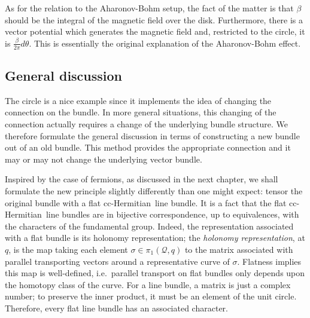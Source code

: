 \documentclass[11pt]{article}
\theoremstyle{remark}
\begin{document}
As for the relation to the Aharonov-Bohm setup, the fact of the matter
is that $\beta$ 
should be the integral of the magnetic field over the
disk. Furthermore, there is a vector potential which generates the
magnetic field and, restricted to the circle, it is 
$\frac{\beta}{2\pi}d\theta$. 
This is essentially 
the original explanation of
the Aharonov-Bohm effect.

\subsection{General discussion}
The circle is a nice example since it implements the idea of changing
the connection on the bundle. In more general situations, this
changing of the connection actually requires a change of the
underlying bundle structure. We therefore formulate the general
discussion in terms of constructing a new bundle out of an old
bundle. This method provides the appropriate connection and it may or
may not change the underlying vector bundle. 


Inspired by the case of fermions, as discussed in the next chapter, 
we shall formulate the new principle slightly differently than one
might expect: tensor
the original bundle with a flat cc-Hermitian\ line bundle.
It is a fact that the flat cc-Hermitian\ line
bundles are in bijective correspondence, up to equivalences,
 with the characters of the
fundamental group. Indeed, 
the  representation associated with
a flat bundle is its holonomy representation; the \emph{holonomy
representation}, at \ensuremath{q}, is the map taking 
each element $\ensuremath{\sigma} \in \ensuremath{\pi_1 ({\ensuremath{\mathcal{Q}}, \ensuremath{q}})}$ to  the matrix
associated with  
parallel transporting vectors around a representative curve of \ensuremath{\sigma}. Flatness
implies this map is well-defined, i.e.\ parallel transport on flat
bundles only depends
upon the homotopy class of the curve.  For a line bundle, a matrix
is just a complex number; to preserve the inner product, it must be an
element of the unit circle. Therefore, every flat line bundle has an
associated character. 
\end{document}

